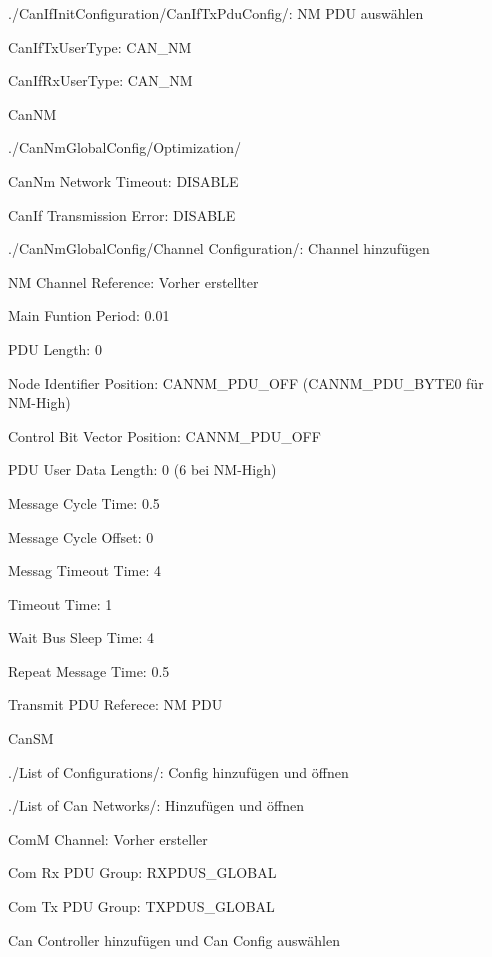 \begin{compactitem}
    \begin{compactitem}
        \item ./CanIfInitConfiguration/CanIfTxPduConfig/: NM PDU auswählen
        \item CanIfTxUserType: CAN\_NM
        \item CanIfRxUserType: CAN\_NM
    \end{compactitem}
    \item CanNM
    \begin{compactitem}
        \item ./CanNmGlobalConfig/Optimization/
        \begin{compactitem}
            \item CanNm Network Timeout: DISABLE
            \item CanIf Transmission Error: DISABLE
        \end{compactitem}
        \item ./CanNmGlobalConfig/Channel Configuration/: Channel hinzufügen
        \begin{compactitem}
            \item NM Channel Reference: Vorher erstellter
            \item Main Funtion Period: 0.01
            \item PDU Length: 0
            \item Node Identifier Position: CANNM\_PDU\_OFF (CANNM\_PDU\_BYTE0 für NM-High)
            \item Control Bit Vector Position: CANNM\_PDU\_OFF
            \item PDU User Data Length: 0 (6 bei NM-High)
            \item Message Cycle Time: 0.5
            \item Message Cycle Offset: 0
            \item Messag Timeout Time: 4
            \item Timeout Time: 1
            \item Wait Bus Sleep Time: 4
            \item Repeat Message Time: 0.5
            \item Transmit PDU Referece: NM PDU
        \end{compactitem}
    \end{compactitem}
    \item CanSM
    \begin{compactitem}
        \item ./List of Configurations/: Config hinzufügen und öffnen
        \item ./List of Can Networks/: Hinzufügen und öffnen
        \item ComM Channel: Vorher ersteller
        \item Com Rx PDU Group: RXPDUS\_GLOBAL
        \item Com Tx PDU Group: TXPDUS\_GLOBAL
        \item Can Controller hinzufügen und Can Config auswählen
    \end{compactitem}






\end{compactitem}
